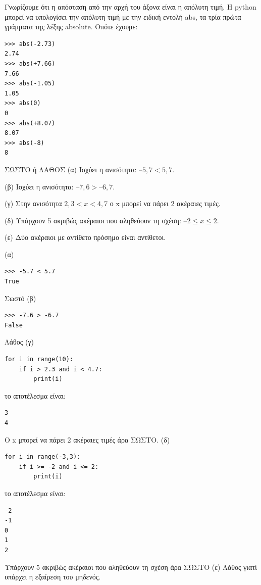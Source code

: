 Γνωρίζουμε ότι η απόσταση από την αρχή του άξονα είναι η απόλυτη τιμή. Η python μπορεί να υπολογίσει την απόλυτη τιμή με την ειδική εντολή abs, τα τρία πρώτα γράμματα της λέξης absolute.
Οπότε έχουμε:
\begin{lstlisting}
>>> abs(-2.73)
2.74
>>> abs(+7.66)
7.66
>>> abs(-1.05)
1.05
>>> abs(0)
0
>>> abs(+8.07)
8.07
>>> abs(-8)
8
\end{lstlisting}
\begin{exercise}
ΣΩΣΤΟ ή  ΛΑΘΟΣ
(α) Iσχύει η ανισότητα: $–5,7 < 5,7$. 

(β) Ισχύει η ανισότητα: $–7,6 > –6,7$. 

(γ) Στην ανισότητα $2,3 < x < 4,7$ ο x μπορεί να πάρει 2 ακέραιες τιμές. 

(δ) Υπάρχουν 5 ακριβώς ακέραιοι που αληθεύουν τη σχέση: $–2 \leq x \leq 2$.

(ε) Δύο ακέραιοι με αντίθετο πρόσημο είναι αντίθετοι.
\end{exercise}
(α)
\begin{lstlisting}
>>> -5.7 < 5.7
True
\end{lstlisting}
Σωστό
(β)
\begin{lstlisting}
>>> -7.6 > -6.7
False
\end{lstlisting}
Λάθος
(γ) 
\begin{lstlisting}
for i in range(10):
    if i > 2.3 and i < 4.7:
        print(i)
\end{lstlisting}
το αποτέλεσμα είναι:
\begin{lstlisting}
3
4
\end{lstlisting}
Ο x μπορεί να πάρει 2 ακέραιες τιμές άρα ΣΩΣΤΟ.
(δ)
\begin{lstlisting}
for i in range(-3,3):
    if i >= -2 and i <= 2:
        print(i)
\end{lstlisting}
το αποτέλεσμα είναι:
\begin{lstlisting}
-2
-1
0
1
2
\end{lstlisting}
Υπάρχουν 5 ακριβώς ακέραιοι που αληθεύουν τη σχέση άρα ΣΩΣΤΟ
(ε) Λάθος γιατί υπάρχει η εξαίρεση του μηδενός.

